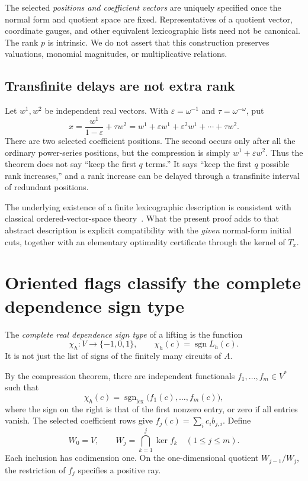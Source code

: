 \documentclass[11pt,a4paper]{article}
\numberwithin{equation}{section}
\theoremstyle{plain}
\newcommand{\eps}{\varepsilon}
\newcommand{\sgn}{\operatorname{sgn}}
\newcommand{\lex}{\mathrm{lex}}
\begin{document}
\begin{remark}
The selected \emph{positions and coefficient vectors} are uniquely
specified once the normal form and quotient space are fixed. Representatives
of a quotient vector, coordinate gauges, and other equivalent lexicographic
lists need not be canonical. The rank $p$ is intrinsic. We do not assert
that this construction preserves valuations, monomial magnitudes, or
multiplicative relations.
\end{remark}

\subsection{Transfinite delays are not extra rank}
\begin{example}\label{poly:ts:ex:transfinite-delay}
Let $w^1,w^2$ be independent real vectors. With $\eps=\omega^{-1}$ and
$\tau=\omega^{-\omega}$, put
\[
 x=\frac{w^1}{1-\eps}+\tau w^2
  =w^1+\eps w^1+\eps^2w^1+\cdots+\tau w^2.
\]
There are two selected coefficient positions. The second occurs only after
all the ordinary power-series positions, but the compression is simply
$w^1+\eps w^2$. Thus the theorem does not say ``keep the first $q$ terms.''
It says ``keep the first $q$ possible rank increases,'' and a rank increase
can be delayed through a transfinite interval of redundant positions.
\end{example}

The underlying existence of a finite lexicographic description is consistent
with classical ordered-vector-space theory~\cite{ts:Wortel}. What the present
proof adds to that abstract description is explicit compatibility with the
\emph{given} normal-form initial cuts, together with an elementary optimality
certificate through the kernel of $T_x$.

\section{Oriented flags classify the complete dependence sign type}
\label{poly:sec:flags}

\begin{definition}\label{poly:def:signtype}
The \emph{complete real dependence sign type} of a lifting is the function
\[
 \chi_h:V\longrightarrow\{-1,0,1\},\qquad
 \chi_h(c)=\sgn L_h(c).
\]
It is not just the list of signs of the finitely many circuits of $A$.
\end{definition}

By the compression theorem, there are independent functionals
$f_1,\ldots,f_m\in V^*$ such that
\begin{equation}\label{poly:eq:lexsign}
 \chi_h(c)=\sgn_\lex\bigl(f_1(c),\ldots,f_m(c)\bigr),
\end{equation}
where the sign on the right is that of the first nonzero entry, or zero if
all entries vanish. The selected coefficient rows give
$f_j(c)=\sum_i c_i b_{j,i}$.
Define
\[
 W_0=V,\qquad W_j=\bigcap_{k=1}^j\ker f_k\quad(1\le j\le m).
\]
Each inclusion has codimension one. On the one-dimensional quotient
$W_{j-1}/W_j$, the restriction of $f_j$ specifies a positive ray.
\end{document}
